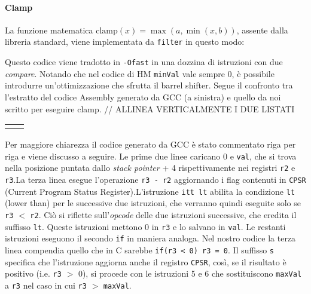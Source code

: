 \paragraph*{Clamp} La funzione matematica $\text{clamp}(x) = 
\max(a,\min(x,b))$, assente dalla libreria standard, viene implementata da 
\verb+filter+ in questo modo:

Questo codice viene tradotto in \verb|-Ofast| in una dozzina di istruzioni con 
due \emph{compare}. Notando che nel codice di HM \verb|minVal| vale sempre 0, è 
possibile introdurre un'ottimizzazione che sfrutta il barrel shifter. \newline
Segue il confronto tra l'estratto del codice Assembly generato da GCC (a 
sinistra) e quello da noi scritto per eseguire clamp.
// ALLINEA VERTICALMENTE I DUE LISTATI
\lstset{style=cstyle}
\begin{center}
  \begin{tabular}{ l l }
     &
     \\
  \end{tabular}
\end{center}
Per maggiore chiarezza il codice generato da GCC è stato commentato riga per 
riga e viene discusso a seguire. \newline
Le prime due linee caricano 0 e \verb|val|, che si trova nella posizione 
puntata dallo \emph{stack pointer} + 4 rispettivamente nei registri \verb|r2| e 
\verb|r3|.\newline La terza linea esegue l'operazione \verb|r3 - r2| 
aggiornando i flag contenuti in \verb|CPSR| (Current Program Status 
Register).\newline L'istruzione \verb|itt lt| abilita la condizione \verb|lt| 
(lower than) per le successive due istruzioni, che verranno quindi eseguite 
solo se \verb|r3| $<$ \verb|r2|. Ciò si riflette sull'\emph{opcode} delle due 
istruzioni successive, che eredita il suffisso \verb|lt|. Queste istruzioni 
mettono 0 in \verb|r3| e lo salvano in \verb|val|. \newline Le restanti 
istruzioni eseguono il secondo \verb|if| in maniera analoga. \newline
Nel nostro codice la terza linea compendia quello che in C sarebbe 
\verb|if(r3 < 0) r3 = 0|. Il suffisso \verb|s| specifica che l'istruzione 
aggiorna anche il 
registro \verb|CPSR|, così, se il risultato è positivo (i.e. \verb|r3| $>$ 0), 
si procede con le istruzioni 5 e 6 che sostituiscono \verb|maxVal| a \verb|r3| 
nel caso in cui \verb|r3| $>$ \verb|maxVal|. 

